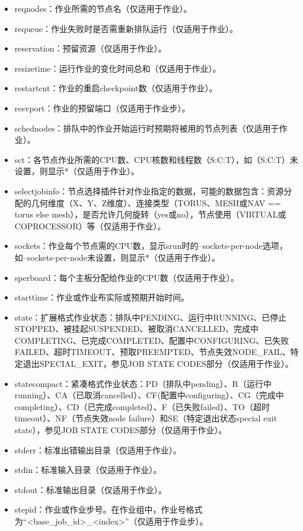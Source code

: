 \begin{itemize}
\begin{itemize}
\begin{itemize}
   	\item reqnodes：作业所需的节点名（仅适用于作业）。
    \item requeue：作业失败时是否需重新排队运行（仅适用于作业）。
    \item reservation：预留资源（仅适用于作业）。
    \item resizetime：运行作业的变化时间总和（仅适用于作业）。
    \item restartcnt：作业的重启checkpoint数（仅适用于作业）。
    \item resvport：作业的预留端口（仅适用于作业步）。
    \item schednodes：排队中的作业开始运行时预期将被用的节点列表（仅适用于作业）。
    \item sct：各节点作业所需的CPU数、CPU核数和线程数（S:C:T），如（S:C:T）未设置，则显示*（仅适用于作业）。
    \item selectjobinfo：节点选择插件针对作业指定的数据，可能的数据包含：资源分配的几何维度（X、Y、Z维度）、连接类型（TORUS、MESH或NAV == torus else mesh），是否允许几何旋转（yes或no），节点使用（VIRTUAL或COPROCESSOR）等（仅适用于作业）。
    \item sockets：作业每个节点需的CPU数，显示srun时的--sockets-per-node选项，如--sockets-per-node未设置，则显示*（仅适用于作业）。
    \item sperboard：每个主板分配给作业的CPU数（仅适用于作业）。
    \item starttime：作业或作业布实际或预期开始时间。
    \item state：扩展格式作业状态：排队中PENDING、运行中RUNNING、已停止STOPPED、被挂起SUSPENDED、被取消CANCELLED、完成中COMPLETING、已完成COMPLETED、配置中CONFIGURING、已失败FAILED、超时TIMEOUT、预取PREEMPTED、节点失效NODE\_FAIL、特定退出SPECIAL\_EXIT，参见JOB STATE CODES部分（仅适用于作业）。
    \item statecompact：紧凑格式作业状态：PD（排队中pending）、R（运行中running）、CA（已取消cancelled）、CF(配置中configuring）、CG（完成中completing）、CD（已完成completed）、F（已失败failed）、TO（超时timeout）、NF（节点失效node failure）和SE（特定退出状态special exit state），参见JOB STATE CODES部分（仅适用于作业）。
    \item stderr：标准出错输出目录（仅适用于作业）。
    \item stdin：标准输入目录（仅适用于作业）。
    \item stdout：标准输出目录（仅适用于作业）。
    \item stepid：作业或作业步号。在作业组中，作业号格式为``<base\_job\_id>\_<index>''（仅适用于作业步）。

\end{itemize}
\end{itemize}
\end{itemize}
